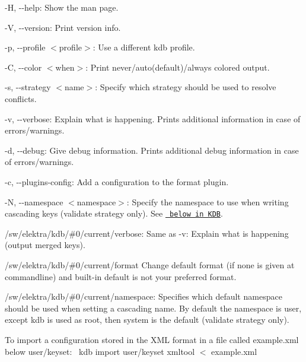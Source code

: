 \begin{DoxyItemize}
\item {\ttfamily -\/H}, {\ttfamily -\/-\/help}\+: Show the man page.
\item {\ttfamily -\/V}, {\ttfamily -\/-\/version}\+: Print version info.
\item {\ttfamily -\/p}, {\ttfamily -\/-\/profile $<$profile$>$}\+: Use a different kdb profile.
\item {\ttfamily -\/C}, {\ttfamily -\/-\/color $<$when$>$}\+: Print never/auto(default)/always colored output.
\item {\ttfamily -\/s}, {\ttfamily -\/-\/strategy $<$name$>$}\+: Specify which strategy should be used to resolve conflicts.
\item {\ttfamily -\/v}, {\ttfamily -\/-\/verbose}\+: Explain what is happening. Prints additional information in case of errors/warnings.
\item {\ttfamily -\/d}, {\ttfamily -\/-\/debug}\+: Give debug information. Prints additional debug information in case of errors/warnings.
\item {\ttfamily -\/c}, {\ttfamily -\/-\/plugins-\/config}\+: Add a configuration to the format plugin.
\item {\ttfamily -\/N}, {\ttfamily -\/-\/namespace $<$namespace$>$}\+: Specify the namespace to use when writing cascading keys ({\ttfamily validate} strategy only). See \href{\#KDB}{\texttt{ below in K\+DB}}.
\end{DoxyItemize}


\begin{DoxyItemize}
\item {\ttfamily /sw/elektra/kdb/\#0/current/verbose}\+: Same as {\ttfamily -\/v}\+: Explain what is happening (output merged keys).
\item {\ttfamily /sw/elektra/kdb/\#0/current/format} Change default format (if none is given at commandline) and built-\/in default is not your preferred format.
\item {\ttfamily /sw/elektra/kdb/\#0/current/namespace}\+: Specifies which default namespace should be used when setting a cascading name. By default the namespace is user, except {\ttfamily kdb} is used as root, then {\ttfamily system} is the default ({\ttfamily validate} strategy only).
\end{DoxyItemize}

To import a configuration stored in the X\+ML format in a file called {\ttfamily example.\+xml} below {\ttfamily user/keyset}\+:~\newline
 {\ttfamily kdb import user/keyset xmltool $<$ example.\+xml}

